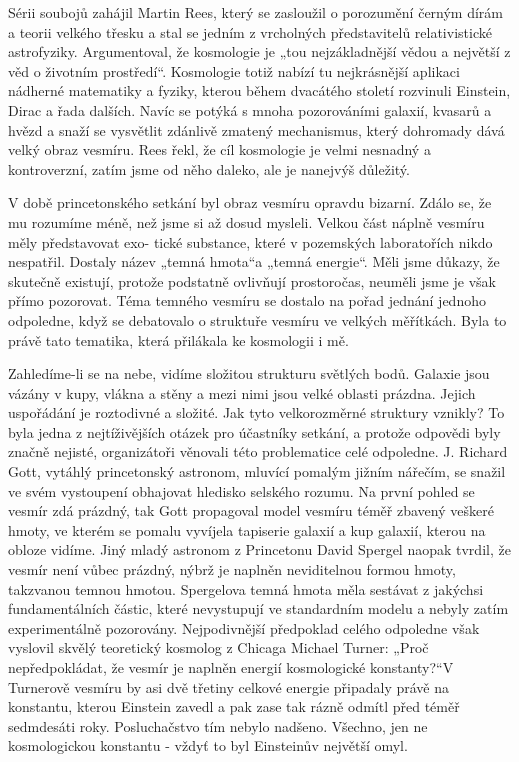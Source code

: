   Sérii soubojů zahájil Martin Rees, který se zasloužil o porozumění černým dírám a teorii velkého
  třesku a stal se jedním z vrcholných představitelů relativistické astrofyziky. Argumentoval, že
  kosmologie je „tou nejzákladnější vědou a největší z věd o životním prostředí“. Kosmologie totiž
  nabízí tu nejkrásnější aplikaci nádherné matematiky a fyziky, kterou během dvacátého století
  rozvinuli Einstein, Dirac a řada dalších. Navíc se potýká s mnoha pozorováními galaxií, kvasarů a
  hvězd a snaží se vysvětlit zdánlivě zmatený mechanismus, který dohromady dává velký obraz vesmíru.
  Rees řekl, že cíl kosmologie je velmi nesnadný a kontroverzní, zatím jsme od něho daleko, ale je
  nanejvýš důležitý. 
  
  V době princetonského setkání byl obraz vesmíru opravdu bizarní. Zdálo se, že mu rozumíme méně,
  než jsme si až dosud mysleli. Velkou část náplně vesmíru měly představovat exo- tické substance,
  které v pozemských laboratořích nikdo nespatřil. Dostaly název „temná hmota“a „temná energie“.
  Měli jsme důkazy, že skutečně existují, protože podstatně ovlivňují prostoročas, neuměli jsme je
  však přímo pozorovat. Téma temného vesmíru se dostalo na pořad jednání jednoho odpoledne, když se
  debatovalo o struktuře vesmíru ve velkých měřítkách. Byla to právě tato tematika, která přilákala
  ke kosmologii i mě. 
  
  Zahledíme-li se na nebe, vidíme složitou strukturu světlých bodů. Galaxie jsou vázány v kupy,
  vlákna a stěny a mezi nimi jsou velké oblasti prázdna. Jejich uspořádání je roztodivné a složité.
  Jak tyto velkorozměrné struktury vznikly? To byla jedna z nejtíživějších otázek pro účastníky
  setkání, a protože odpovědi byly značně nejisté, organizátoři věnovali této problematice celé
  odpoledne. J. Richard Gott, vytáhlý princetonský astronom, mluvící pomalým jižním nářečím, se
  snažil ve svém vystoupení obhajovat hledisko selského rozumu. Na první pohled se vesmír zdá
  prázdný, tak Gott propagoval model vesmíru téměř zbavený veškeré hmoty, ve kterém se pomalu
  vyvíjela tapiserie galaxií a kup galaxií, kterou na obloze vidíme. Jiný mladý astronom z
  Princetonu David Spergel naopak tvrdil, že vesmír není vůbec prázdný, nýbrž je naplněn
  neviditelnou formou hmoty, takzvanou temnou hmotou. Spergelova temná hmota měla sestávat z
  jakýchsi fundamentálních částic, které nevystupují ve standardním modelu a nebyly zatím
  experimentálně pozorovány. Nejpodivnější předpoklad celého odpoledne však vyslovil skvělý
  teoretický kosmolog z Chicaga Michael Turner: „Proč nepředpokládat, že vesmír je naplněn energií
  kosmologické konstanty?“V Turnerově vesmíru by asi dvě třetiny celkové energie připadaly právě na
  konstantu, kterou Einstein zavedl a pak zase tak rázně odmítl před téměř sedmdesáti roky.
  Posluchačstvo tím nebylo nadšeno. Všechno, jen ne kosmologickou konstantu - vždyť to byl
  Einsteinův největší omyl. 
  
